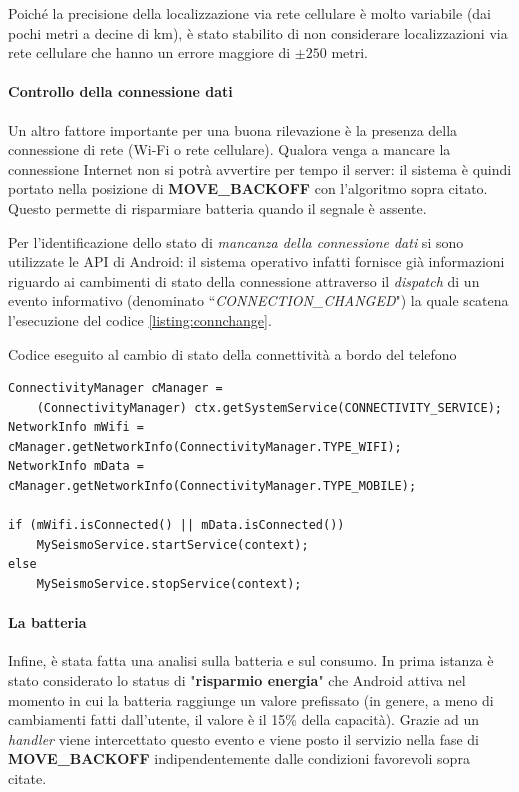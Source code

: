 \documentclass[a4paper,10pt]{memoir}
\begin{document}
Poiché la precisione della localizzazione via rete cellulare è molto variabile (dai pochi metri a decine di km), è stato stabilito di non considerare localizzazioni via rete cellulare che hanno un errore maggiore di $\pm250$ metri.

\paragraph{Controllo della connessione dati} Un altro fattore importante per una buona rilevazione è la presenza della connessione di rete (Wi-Fi o rete cellulare). Qualora venga a mancare la connessione Internet non si potrà avvertire per tempo il server: il sistema è quindi portato nella posizione di \textbf{MOVE\_BACKOFF} con l'algoritmo sopra citato. Questo permette di risparmiare batteria quando il segnale è assente.

Per l'identificazione dello stato di \textit{mancanza della connessione dati} si sono utilizzate le API di Android: il sistema operativo infatti fornisce già informazioni riguardo ai cambimenti di stato della connessione attraverso il \textit{dispatch} di un evento informativo (denominato ``\textit{CONNECTION\_CHANGED}") la quale scatena l'esecuzione del codice \ref{listing:connchange}.


\begin{listing}[H]
\caption{Codice eseguito al cambio di stato della connettività a bordo del telefono}
\label{listing:connchange}
\begin{verbatim}
ConnectivityManager cManager =
	(ConnectivityManager) ctx.getSystemService(CONNECTIVITY_SERVICE);
NetworkInfo mWifi = cManager.getNetworkInfo(ConnectivityManager.TYPE_WIFI);
NetworkInfo mData = cManager.getNetworkInfo(ConnectivityManager.TYPE_MOBILE);

if (mWifi.isConnected() || mData.isConnected())
	MySeismoService.startService(context);
else
	MySeismoService.stopService(context);
\end{verbatim}
\end{listing}

\paragraph{La batteria} Infine, è stata fatta una analisi sulla batteria e sul consumo. In prima istanza è stato considerato lo status di "\textbf{risparmio energia}" che Android attiva nel momento in cui la batteria raggiunge un valore prefissato (in genere, a meno di cambiamenti fatti dall'utente, il valore è il 15\% della capacità). Grazie ad un \textit{handler} viene intercettato questo evento e viene posto il servizio nella fase di \textbf{MOVE\_BACKOFF} indipendentemente dalle condizioni favorevoli sopra citate.
\end{document}
